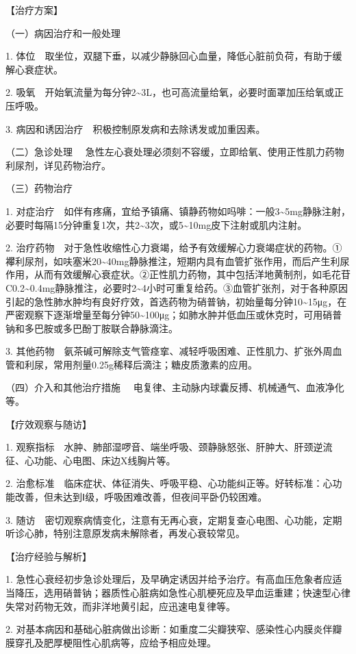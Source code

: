 【治疗方案】

{（一）病因治疗和一般处理}

1.
体位　取坐位，双腿下垂，以减少静脉回心血量，降低心脏前负荷，有助于缓解心衰症状。

2.
吸氧　开始氧流量为每分钟2\textasciitilde{}3L，也可高流量给氧，必要时面罩加压给氧或正压呼吸。

3. 病因和诱因治疗　积极控制原发病和去除诱发或加重因素。

{（二）急诊处理}
　急性左心衰处理必须刻不容缓，立即给氧、使用正性肌力药物利尿剂，详见药物治疗。

{（三）药物治疗}

1.
对症治疗　如伴有疼痛，宜给予镇痛、镇静药物如吗啡：一般3\textasciitilde{}5mg静脉注射，必要时每隔15分钟重复1次，共2\textasciitilde{}3次，或5\textasciitilde{}10mg皮下注射或肌内注射。

2.
治疗药物　对于急性收缩性心力衰竭，给予有效缓解心力衰竭症状的药物。①襻利尿剂，如呋塞米20\textasciitilde{}40mg静脉推注，短期内具有血管扩张作用，而后产生利尿作用，从而有效缓解心衰症状。②正性肌力药物，其中包括洋地黄制剂，如毛花苷C0.2\textasciitilde{}0.4mg静脉推注，必要时2\textasciitilde{}4小时可重复给药。③血管扩张剂，对于各种原因引起的急性肺水肿均有良好疗效，首选药物为硝普钠，初始量每分钟10\textasciitilde{}15μg，在严密观察下逐渐增量至每分钟50\textasciitilde{}100μg；如肺水肿并低血压或休克时，可用硝普钠和多巴胺或多巴酚丁胺联合静脉滴注。

3.
其他药物　氨茶碱可解除支气管痉挛、减轻呼吸困难、正性肌力、扩张外周血管和利尿，常用剂量0.25g稀释后滴注；糖皮质激素的应用。

{（四）介入和其他治疗措施}
　电复律、主动脉内球囊反搏、机械通气、血液净化等。

【疗效观察与随访】

1.
观察指标　水肿、肺部湿啰音、端坐呼吸、颈静脉怒张、肝肿大、肝颈逆流征、心功能、心电图、床边X线胸片等。

2.
治愈标准　临床症状、体征消失、呼吸平稳、心功能纠正等。好转标准：心功能改善，但未达到Ⅰ级，呼吸困难改善，但夜间平卧仍较困难。

3.
随访　密切观察病情变化，注意有无再心衰，定期复查心电图、心功能，定期听诊心肺，特别注意原发病未解除者，再发心衰较常见。

【治疗经验与解析】

1.
急性心衰经初步急诊处理后，及早确定诱因并给予治疗。有高血压危象者应适当降压，选用硝普钠；器质性心脏病如急性心肌梗死应及早血运重建；快速型心律失常对药物无效，而非洋地黄引起，应迅速电复律等。

2.
对基本病因和基础心脏病做出诊断：如重度二尖瓣狭窄、感染性心内膜炎伴瓣膜穿孔及肥厚梗阻性心肌病等，应给予相应处理。


